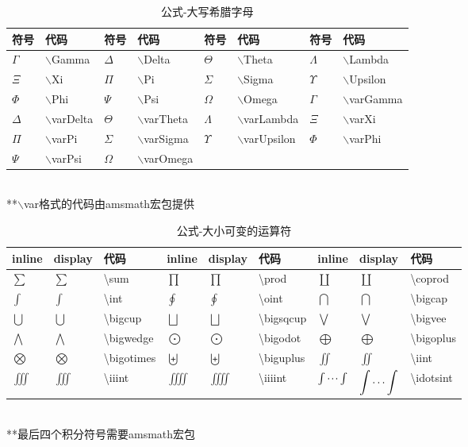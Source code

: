 \documentclass[UTF8,fontset=ubuntu]{ctexart}
\begin{document}
\begin{table}[H]
\begin{tabular}{l l l l l l l l}
	\hline
	符号 & 代码 & 符号 & 代码 & 符号 & 代码 & 符号 & 代码\\
	\hline
	$\Gamma$ & $\backslash$Gamma & $\Delta$ & $\backslash$Delta & $\Theta$ & $\backslash$Theta & $\Lambda$ & $\backslash$Lambda\\
	$\Xi$ & $\backslash$Xi & $\Pi$ & $\backslash$Pi & $\Sigma$ & $\backslash$Sigma & $\Upsilon$ & $\backslash$Upsilon\\
	$\Phi$ & $\backslash$Phi & $\Psi$ & $\backslash$Psi & $\Omega$ & $\backslash$Omega & $\varGamma$ & $\backslash$varGamma\\
	$\varDelta$ & $\backslash$varDelta & $\varTheta$ & $\backslash$varTheta & $\varLambda$ & $\backslash$varLambda & $\varXi$ & $\backslash$varXi\\
	$\varPi$ & $\backslash$varPi & $\varSigma$ & $\backslash$varSigma & $\varUpsilon$ & $\backslash$varUpsilon & $\varPhi$ & $\backslash$varPhi\\
	$\varPsi$ & $\backslash$varPsi & $\varOmega$ & $\backslash$varOmega\\
	\hline
\end{tabular}\\[2mm]
**$\backslash$var格式的代码由amsmath宏包提供
\caption{公式-大写希腊字母}
\end{table}

\begin{table}[H]
\begin{tabular}{l l l l l l l l l}
    \hline
    inline & display & 代码 & inline & display & 代码 & inline & display & 代码\\
    \hline
    $\sum$ & $\displaystyle\sum$ & \textbackslash sum & $\prod$ & $\displaystyle\prod$ & \textbackslash prod & $\coprod$ & $\displaystyle\coprod$ & \textbackslash coprod\\
    $\int$ & $\displaystyle\int$ & \textbackslash int & $\oint$ & $\displaystyle\oint$ & \textbackslash oint & $\bigcap$ & $\displaystyle\bigcap$ & \textbackslash bigcap\\
    $\bigcup$ & $\displaystyle\bigcup$ & \textbackslash bigcup & $\bigsqcup$ & $\displaystyle\bigsqcup$ & \textbackslash bigsqcup & $\bigvee$ & $\displaystyle\bigvee$ & \textbackslash bigvee\\
    $\bigwedge$ & $\displaystyle\bigwedge$ & \textbackslash bigwedge & $\bigodot$ & $\displaystyle\bigodot$ & \textbackslash bigodot & $\bigoplus$ & $\displaystyle\bigoplus$ & \textbackslash bigoplus\\
    $\bigotimes$ & $\displaystyle\bigotimes$ & \textbackslash bigotimes & $\biguplus$ & $\displaystyle\biguplus$ & \textbackslash biguplus & $\iint$ & $\displaystyle\iint$ & \textbackslash iint\\
    $\iiint$ & $\displaystyle\iiint$ & \textbackslash iiint & $\iiiint$ & $\displaystyle\iiiint$ & \textbackslash iiiint & $\idotsint$ & $\displaystyle\idotsint$ & \textbackslash idotsint\\
	\hline
\end{tabular}\\[2mm]
**最后四个积分符号需要amsmath宏包
\caption{公式-大小可变的运算符}
\end{table}
\end{document}
